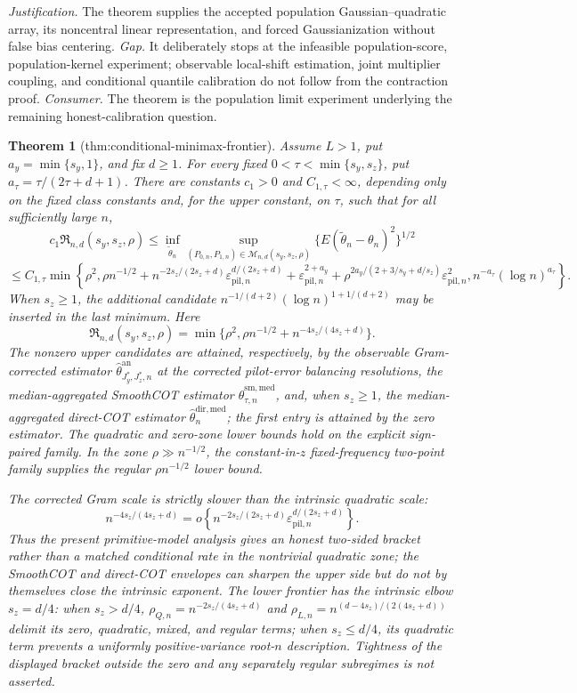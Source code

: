 \documentclass{article}
\newtheorem{theorem}{Theorem}
\begin{document}
\par\smallskip\noindent \textit{Justification.} The theorem supplies the accepted population Gaussian--quadratic array, its noncentral linear representation, and forced Gaussianization without false bias centering. \textit{Gap.} It deliberately stops at the infeasible population-score, population-kernel experiment; observable local-shift estimation, joint multiplier coupling, and conditional quantile calibration do not follow from the contraction proof. \textit{Consumer.} The theorem is the population limit experiment underlying the remaining honest-calibration question.

\begin{theorem}[thm:conditional-minimax-frontier]\label{thm:conditional-minimax-frontier}
Assume \(L>1\), put \(a_y=\min\{s_y,1\}\), and fix \(d\ge1\). For every fixed \(0<\tau<\min\{s_y,s_z\}\), put \(a_\tau=\tau/(2\tau+d+1)\). There are constants \(c_1>0\) and \(C_{1,\tau}<\infty\), depending only on the fixed class constants and, for the upper constant, on \(\tau\), such that for all sufficiently large \(n\),
\[
c_1\mathfrak R_{n,d}(s_y,s_z,\rho)\le\inf_{\widetilde\theta_n}\sup_{(P_{0,n},P_{1,n})\in\mathcal M_{n,d}(s_y,s_z,\rho)}\{E(\widetilde\theta_n-\theta_n)^2\}^{1/2}
\]
\[
\le C_{1,\tau}\min\!\left\{
\rho^2,
\rho n^{-1/2}
+n^{-2s_z/(2s_z+d)}\varepsilon_{\mathrm{pil},n}^{d/(2s_z+d)}
+\varepsilon_{\mathrm{pil},n}^{2+a_y}
+\rho^{2a_y/(2+3/s_y+d/s_z)}\varepsilon_{\mathrm{pil},n}^2,
n^{-a_\tau}(\log n)^{a_\tau}
\right\}.
\]
When \(s_z\ge1\), the additional candidate \(n^{-1/(d+2)}(\log n)^{1+1/(d+2)}\) may be inserted in the last minimum. Here
\[
\mathfrak R_{n,d}(s_y,s_z,\rho)=\min\{\rho^2,\rho n^{-1/2}+n^{-4s_z/(4s_z+d)}\}.
\]
The nonzero upper candidates are attained, respectively, by the observable Gram-corrected estimator \(\widehat\theta^{\mathrm{an}}_{J_y^*,J_z^*,n}\) at the corrected pilot-error balancing resolutions, the median-aggregated SmoothCOT estimator \(\widehat\theta^{\mathrm{sm,med}}_{\tau,n}\), and, when \(s_z\ge1\), the median-aggregated direct-COT estimator \(\widehat\theta_n^{\mathrm{dir,med}}\); the first entry is attained by the zero estimator. The quadratic and zero-zone lower bounds hold on the explicit sign-paired family. In the zone \(\rho\gg n^{-1/2}\), the constant-in-\(z\) fixed-frequency two-point family supplies the regular \(\rho n^{-1/2}\) lower bound.

The corrected Gram scale is strictly slower than the intrinsic quadratic scale:
\[
n^{-4s_z/(4s_z+d)}
=o\!\left\{n^{-2s_z/(2s_z+d)}
\varepsilon_{\mathrm{pil},n}^{d/(2s_z+d)}\right\}.
\]
Thus the present primitive-model analysis gives an honest two-sided bracket rather than a matched conditional rate in the nontrivial quadratic zone; the SmoothCOT and direct-COT envelopes can sharpen the upper side but do not by themselves close the intrinsic exponent.  The lower frontier has the intrinsic elbow \(s_z=d/4\): when \(s_z>d/4\), \(\rho_{Q,n}=n^{-2s_z/(4s_z+d)}\) and \(\rho_{L,n}=n^{(d-4s_z)/(2(4s_z+d))}\) delimit its zero, quadratic, mixed, and regular terms; when \(s_z\le d/4\), its quadratic term prevents a uniformly positive-variance root-\(n\) description. Tightness of the displayed bracket outside the zero and any separately regular subregimes is not asserted.
\end{theorem}
\end{document}
